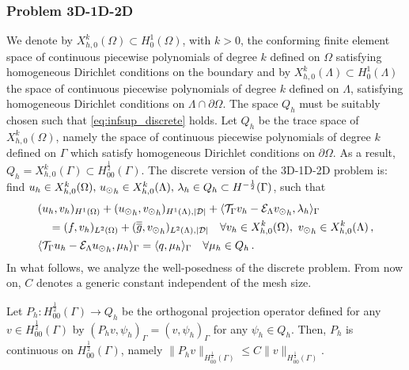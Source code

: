 \documentclass[r]{siamart171218}
\newcommand{\paoloold}[1]{{\color{black}#1}}
\begin{document}
\subsubsection{Problem 3D-1D-2D}
We denote by $X_{h,0}^k(\Omega)\subset H^1_0(\Omega)$, with $k>0$, the conforming finite element space of continuous piecewise polynomials of degree $k$ defined on $\Omega$ satisfying homogeneous Dirichlet conditions on the boundary and by $X_{h,0}^k(\Lambda)\subset H^1_0(\Lambda)$ the space of continuous piecewise polynomials of degree $k$ defined on $\Lambda$, satisfying homogeneous Dirichlet conditions on $\Lambda \cap \partial \Omega$. The space $Q_h$ must be suitably chosen such that \eqref{eq:infsup_discrete} holds. Let $Q_h$ be the trace space of $X_{h,0}^k(\Omega)$, namely the space of continuous piecewise polynomials of degree $k$ defined on $\Gamma$ which satisfy homogeneous Dirichlet conditions on $\partial \Omega$. As a result, $Q_h=X_{h,0}^k(\Gamma) \subset H^\frac12_{00}(\Gamma)$. The discrete version of the 3D-1D-2D problem is:
find $u_h \in X_{h,0}^k (\Omega) ,\, {u_{\odot}}_h \in X_{h,0}^k(\Lambda) ,\, \lambda_h \in Q_h \subset H^{-\frac12}(\Gamma )$, such that
\begin{subequations}
\begin{align}
&(u_h,v_h)_{H^1(\Omega)} + ({\ud}_h,{\vd}_h)_{H^1(\Lambda),|\D|}
+ \langle \trace v_h  - \mathcal{E}_{\Lambda} {\vd}_h, \lambda_h \rangle_\Gamma
\\
\nonumber
&\quad = (f,v_h)_{L^2(\Omega)} + (\avrd{g},{\vd}_h)_{L^2(\Lambda),|\D|} 
\quad \forall v_h \in X_{h,0}^k(\Omega), \ {\vd}_h \in X_{h,0}^k(\Lambda)\,,
\\
&\langle \trace u_h - \mathcal{E}_{\Lambda} {\ud}_h , \mu_h \rangle_\Gamma 
= \paoloold{\langle q,\mu_h \rangle_\Gamma}
\quad \forall \mu_h \in Q_h\,.
\end{align}
\end{subequations}
In what follows, we analyze the well-posedness of the discrete problem. 
From now on, $C$ denotes a generic constant independent of the mesh size.

\begin{lemma}\label{lemma:prob1_orthproj}
Let $P_h: H^{\frac 12}_{00}(\Gamma) \rightarrow Q_h$ be the orthogonal projection operator defined  for any $v \in H^{\frac 12}_{00}(\Gamma)$ by
$(P_h v , \psi_h)_\Gamma= (v, \psi_h)_\Gamma$ for any $\psi_h \in Q_h$.
Then, $P_h$ is continuous on $H^{\frac 12}_{00}(\Gamma)$, namely
$\|P_h v\|_{H^{\frac 12}_{00}(\Gamma)} \leq C \|v\|_{H^{\frac 12}_{00}(\Gamma)}$.
\end{lemma}
\end{document}
